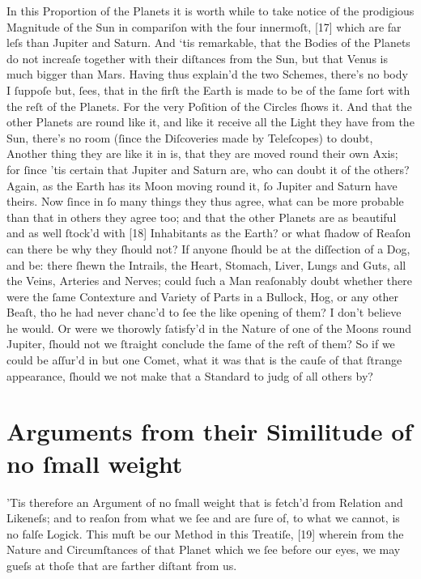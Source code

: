 \documentclass[letterpaper]{book}
\begin{document}
In this Proportion of the Planets it is worth while to take notice of the
prodigious Magnitude of the Sun in compariſon with the four innermoſt, [17]
which are far leſs than Jupiter and Saturn. And ‘tis remarkable, that the
Bodies of the Planets do not increaſe together with their diſtances from the
Sun, but that Venus is much bigger than Mars.  Having thus explain'd the two
Schemes, there's no body I ſuppoſe but, ſees, that in the firſt the Earth is
made to be of the ſame ſort with the reſt of the Planets. For the very
Poſition of the Circles ſhows it. And that the other Planets are round like
it, and like it receive all the Light they have from the Sun, there's no
room (ſince the Diſcoveries made by Teleſcopes) to doubt, Another thing they
are like it in is, that they are moved round their own Axis; for ſince 'tis
certain that Jupiter and Saturn are, who can doubt it of the others? Again,
as the Earth has its Moon moving round it, ſo Jupiter and Saturn have
theirs. Now ſince in ſo many things they thus agree, what can be more
probable than that in others they agree too; and that the other Planets are
as beautiful and as well ſtock'd with [18] Inhabitants as the Earth? or what
ſhadow of Reaſon can there be why they ſhould not?  If anyone ſhould be at
the diſſection of a Dog, and be: there ſhewn the Intrails, the Heart,
Stomach, Liver, Lungs and Guts, all the Veins, Arteries and Nerves; could
ſuch a Man reaſonably doubt whether there were the ſame Contexture and
Variety of Parts in a Bullock, Hog, or any other Beaſt, tho he had never
chanc'd to ſee the like opening of them? I don't believe he would. Or were
we thorowly ſatisfy'd in the Nature of one of the Moons round Jupiter,
ſhould not we ſtraight conclude the ſame of the reſt of them?  So if we
could be aſſur'd in but one Comet, what it was that is the cauſe of that
ſtrange appearance, ſhould we not make that a Standard to judg of all others
by?


\section{Arguments from their Similitude of no ſmall weight}

'Tis therefore an Argument of no ſmall weight that is fetch'd from Relation
and Likeneſs; and to reaſon from what we ſee and are ſure of, to what we
cannot, is no falſe Logick. This muſt be our Method in this Treatiſe, [19]
wherein from the Nature and Circumſtances of that Planet which we ſee
before our eyes, we may gueſs at thoſe that are farther diſtant from us.
\end{document}
